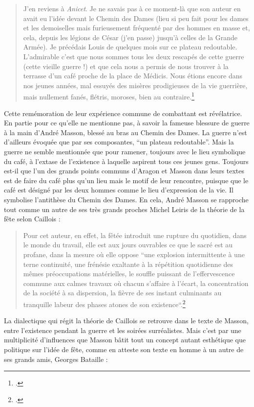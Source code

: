 \begin{quote}J’en reviens à \emph{Anicet}. Je ne savais pas à ce moment-là que son auteur en avait eu l’idée devant le Chemin des Dames (lieu si peu fait pour les dames et les demoiselles mais furieusement fréquenté par des hommes en masse et, cela, depuis les légions de César (j’en passe) jusqu’à celles de la Grande Armée). Je précédais Louis de quelques mois sur ce plateau redoutable. L’admirable c’est que nous sommes tous les deux rescapés de cette guerre (cette vieille guerre !) et que cela nous a permis de nous trouver à la terrasse d’un café proche de la place de Médicis. Nous étions encore dans nos jeunes années, mal essuyés des misères prodigieuses de la vie guerrière, mais nullement fanés, flétris, moroses, bien au contraire.\footcite[p85]{rebelle}\end{quote}

	Cette remémoration de leur expérience commune de combattant est révélatrice. En partie pour ce qu’elle ne mentionne pas, à savoir la fameuse blessure de guerre à la main d’André Masson, blessé au bras au Chemin des Dames. La guerre n’est d’ailleurs évoquée que par ses composantes, \enquote{un plateau redoutable}. Mais la guerre ne semble mentionnée que pour ramener, toujours avec le lieu symbolique du café, à l’extase de l’existence à laquelle aspirent tous ces jeunes gens. Toujours est-il que l’un des grands points communs d’Aragon et Masson dans leurs textes est de faire du café plus qu’un lieu mais le motif de leur rencontre, puisque que le café est désigné par les deux hommes comme le lieu d’expression de la vie. Il symbolise l’antithèse du Chemin des Dames. En cela, André Masson se rapproche tout comme un autre de ses très grands proches Michel Leiris de la théorie de la fête selon Caillois :

 \begin{quote}Pour cet auteur, en effet, la fêtée introduit une rupture du quotidien, dans le monde du travail, elle est aux jours ouvrables ce que le sacré est au profane, dans la mesure où elle oppose “une explosion intermittente à une terne continuité, une frénésie exaltante à la répétition quotidienne des mêmes préoccupations matérielles, le souffle puissant de l’effervescence commune aux calmes travaux où chacun s’affaire à l’écart, la concentration de la société à sa dispersion, la fièvre de ses instant culminants au tranquille labeur des phases atones de son existence“.\footcite[]{poitryguy}\end{quote}

	La dialectique qui régit la théorie de Caillois se retrouve dans le texte de  Masson, entre l’existence pendant la guerre et les soirées surréalistes. Mais c’est par une multiplicité d’influences que Masson bâtit tout un concept autant esthétique que politique sur l’idée de fête, comme en atteste   son texte en homme à un autre de ses grands amis, Georges Bataille :
	
